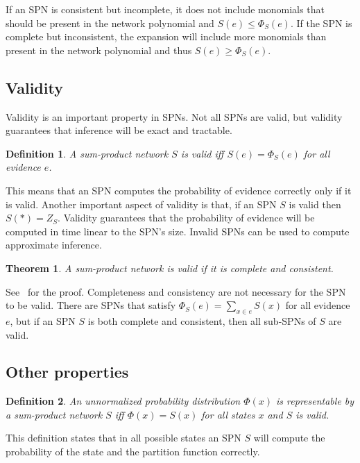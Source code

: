 \documentclass[a4paper,10pt]{article}
\theoremstyle{plain}
\newtheorem*{spn-def}{Definition}
\newtheorem*{spn-thm}{Theorem}
\begin{document}
If an SPN is consistent but incomplete, it does not include monomials that should be present in the
network polynomial and $S(e) \leq \Phi_S(e)$. If the SPN is complete but inconsistent, the
expansion will include more monomials than present in the network polynomial and thus $S(e)\geq
\Phi_S(e)$.

\subsection{Validity}

Validity is an important property in SPNs. Not all SPNs are valid, but validity guarantees
that inference will be exact and tractable.

\begin{spn-def}
  A sum-product network $S$ is valid iff $S(e)=\Phi_S(e)$ for all evidence $e$.
\end{spn-def}

This means that an SPN computes the probability of evidence correctly only if it is valid. Another
important aspect of validity is that, if an SPN $S$ is valid then $S(*)=Z_S$. Validity guarantees
that the probability of evidence will be computed in time linear to the SPN's size. Invalid SPNs
can be used to compute approximate inference.

\begin{spn-thm}
  A sum-product network is valid if it is complete and consistent.
\end{spn-thm}

See~\cite{poon-domingos} for the proof. Completeness and consistency are not necessary for the SPN
to be valid. There are SPNs that satisfy $\Phi_S(e)=\sum_{x\in e}S(x)$ for all evidence $e$, but if
an SPN $S$ is both complete and consistent, then all sub-SPNs of $S$ are valid.

\subsection{Other properties}

\begin{spn-def}
  An unnormalized probability distribution $\Phi(x)$ is representable by a sum-product network $S$
  iff $\Phi(x)=S(x)$ for all states $x$ and $S$ is valid.
\end{spn-def}

This definition states that in all possible states an SPN $S$ will compute the probability of the
state and the partition function correctly.
\end{document}
